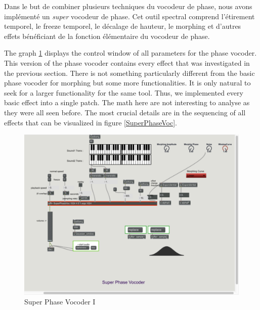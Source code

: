 Dans le but de combiner plusieurs techniques du vocodeur de phase, nous avons implémenté un \guillemotleft \textit{super} vocodeur de phase\guillemotright . Cet outil spectral comprend l'étirement temporel, le freeze temporel, le décalage de hauteur, le morphing et d'autres effets bénéficiant de la fonction élémentaire du vocodeur de phase.

The graph \ref{FirstMorphingTry} displays the control window of all parameters for the phase vocoder. This version of the phase vocoder contains every effect that was investigated in the previous section. There is not something particularly different from the basic phase vocoder for morphing but some more functionalities. It is only natural to seek for a larger functionality for the same tool. Thus, we implemented every basic effect into a single patch. The math here are not interesting to analyse as they were all seen before. The most crucial details are in the sequencing of all effects that can be visualized in figure \ref{SuperPhaseVoc}.


	\begin{figure}
        \centering
        \includegraphics[width = \textwidth]{Graphs/FirstMorphingTry.png}
        \caption{Super Phase Vocoder I}
        \label{FirstMorphingTry}
    \end{figure}



